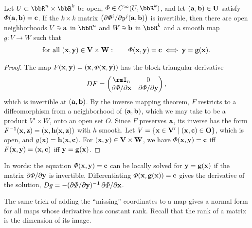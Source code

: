 \begin{thm}\label{ImMT}
    Let $U\subset\bbR^n\times\bbR^k$ be open, $\varPhi\in C^\infty(U,\bbR^k)$, and let $(\bf{a},\bf{b})\in U$ satisfy $\varPhi(\bf{a},\bf{b})=\bf{c}$. If the $k\times k$ matrix $\big(\partial\varPhi^i/\partial y^j(\bf{a},\bf{b})\big)$ is invertible, then there are open neighborhoods $V\ni\bf{a}$ in $\bbR^n$ and $W\ni\bf{b}$ in $\bbR^k$ and a smooth map $g:V\to W$ such that
    \[\text{for all }(\bf{x},\bf{y})\in V\times W:\qquad\varPhi(\bf{x},\bf{y})=\bf{c}\iff\bf{y}=g(\bf{x}).\]
\end{thm}
\begin{proof}
    The map $F(\bf{x},\bf{y})=(\bf{x},\varPhi(\bf{x},\bf{y}))$ has the block triangular derivative
    \[DF=\begin{pmatrix}\rmI_n&0\\ \partial\varPhi/\partial\bf{x}&\partial\varPhi/\partial\bf{y}\end{pmatrix},\]
    which is invertible at $(\bf{a},\bf{b})$. By the inverse mapping theorem, $F$ restricts to a diffeomorphism from a neighborhood of $(\bf{a},\bf{b})$, which we may take to be a product $V'\times W$, onto an open set $O$. Since $F$ preserves $\bf{x}$, its inverse has the form $F^{-1}(\bf{x},\bf{z})=(\bf{x},h(\bf{x},\bf{z}))$ with $h$ smooth. Let $V=\{\bf{x}\in V'\mid(\bf{x},\bf{c})\in O\}$, which is open, and $g(\bf{x})=h(\bf{x},\bf{c})$. For $(\bf{x},\bf{y})\in V\times W$, we have $\varPhi(\bf{x},\bf{y})=\bf{c}$ iff $F(\bf{x},\bf{y})=(\bf{x},\bf{c})$ iff $\bf{y}=g(\bf{x})$.
\end{proof}
In words: the equation $\varPhi(\bf{x},\bf{y})=\bf{c}$ can be locally solved for $\bf{y}=g(\bf{x})$ if the matrix $\partial\varPhi/\partial\bf{y}$ is invertible. Differentiating $\varPhi(\bf{x},g(\bf{x}))=\bf{c}$ gives the derivative of the solution, $Dg=-(\partial\varPhi/\partial\bf{y})^{-1}\,\partial\varPhi/\partial\bf{x}$.

The same trick of adding the ``missing'' coordinates to a map gives a normal form for all maps whose derivative has constant rank. Recall that the rank of a matrix is the dimension of its image.

